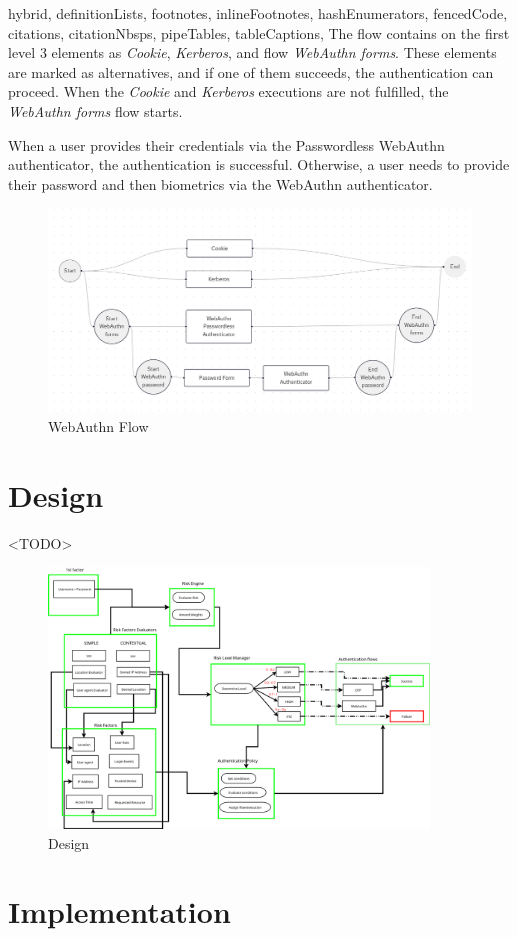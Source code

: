 \documentclass[
  digital,     %
  oneside,     %
  nosansbold,  %
  nocolorbold, %
  lof,         %
  lot,         %
]{fithesis4}
\begin{document}
\begin{markdown*}{%
  hybrid,
  definitionLists,
  footnotes,
  inlineFootnotes,
  hashEnumerators,
  fencedCode,
  citations,
  citationNbsps,
  pipeTables,
  tableCaptions,
}
The flow contains on the first level 3 elements as \textit{Cookie}, \textit{Kerberos}, and flow \textit{WebAuthn forms}.
These elements are marked as alternatives, and if one of them succeeds, the authentication can proceed.
When the \textit{Cookie} and \textit{Kerberos} executions are not fulfilled, the \textit{WebAuthn forms} flow starts.

When a user provides their credentials via the Passwordless WebAuthn authenticator, the authentication is successful.
Otherwise, a user needs to provide their password and then biometrics via the WebAuthn authenticator.

\begin{figure}[htbp]
  \centering
  \includegraphics[width=1.04\textwidth]{img/flow.png}
  \caption{WebAuthn Flow}
  \label{fig:basic-auth-flow}
\end{figure}

\chapter{Design}
\shorthandoff{-}

<TODO>
\begin{figure}
    \centering
    \includegraphics[width=0.9\textwidth]{img/Design1.0.png}
    \caption{Design}
    \label{fig:design}
\end{figure}

\chapter{Implementation}
\shorthandoff{-}

\end{markdown*}
\shorthandon{-}
\end{document}
